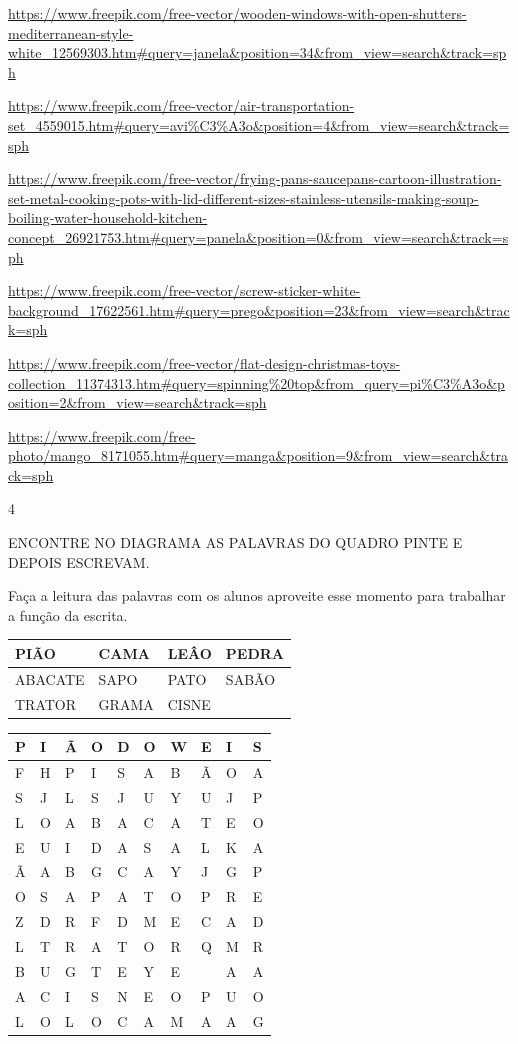 {{\url{https://www.freepik.com/free-vector/wooden-windows-with-open-shutters-mediterranean-style-white_12569303.htm\#query=janela\&position=34\&from_view=search\&track=sph}

\url{https://www.freepik.com/free-vector/air-transportation-set_4559015.htm\#query=avi\%C3\%A3o\&position=4\&from_view=search\&track=sph}

\url{https://www.freepik.com/free-vector/frying-pans-saucepans-cartoon-illustration-set-metal-cooking-pots-with-lid-different-sizes-stainless-utensils-making-soup-boiling-water-household-kitchen-concept_26921753.htm\#query=panela\&position=0\&from_view=search\&track=sph}

\url{https://www.freepik.com/free-vector/screw-sticker-white-background_17622561.htm\#query=prego\&position=23\&from_view=search\&track=sph}

\url{https://www.freepik.com/free-vector/flat-design-christmas-toys-collection_11374313.htm\#query=spinning\%20top\&from_query=pi\%C3\%A3o\&position=2\&from_view=search\&track=sph}

\url{https://www.freepik.com/free-photo/mango_8171055.htm\#query=manga\&position=9\&from_view=search\&track=sph}

\num{4}

ENCONTRE NO DIAGRAMA AS PALAVRAS DO QUADRO PINTE E DEPOIS ESCREVAM.

Faça a leitura das palavras com os alunos aproveite esse momento para
trabalhar a função da escrita.

\begin{longtable}[]{@{}llll@{}}
\toprule
PIÃO & CAMA & LEÂO & PEDRA\tabularnewline
\midrule
\endhead
ABACATE & SAPO & PATO & SABÃO\tabularnewline
TRATOR & GRAMA & CISNE\tabularnewline
\bottomrule
\end{longtable}

\begin{longtable}[]{@{}llllllllll@{}}
\toprule
P & I & Ã & O & D & O & W & E & I & S\tabularnewline
\midrule
\endhead
F & H & P & I & S & A & B & Ã & O & A\tabularnewline
S & J & L & S & J & U & Y & U & J & P\tabularnewline
L & O & A & B & A & C & A & T & E & O\tabularnewline
E & U & I & D & A & S & A & L & K & A\tabularnewline
Ã & A & B & G & C & A & Y & J & G & P\tabularnewline
O & S & A & P & A & T & O & P & R & E\tabularnewline
Z & D & R & F & D & M & E & C & A & D\tabularnewline
L & T & R & A & T & O & R & Q & M & R\tabularnewline
B & U & G & T & E & Y & E & & A & A\tabularnewline
A & C & I & S & N & E & O & P & U & O\tabularnewline
L & O & L & O & C & A & M & A & A & G\tabularnewline
\bottomrule
\end{longtable}

}}
